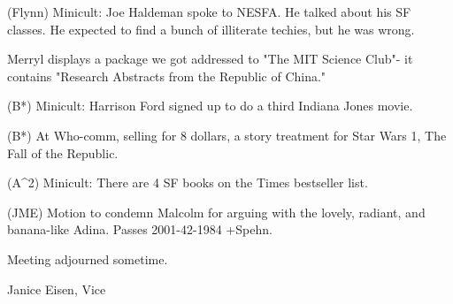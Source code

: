 \documentclass[12pt]{article}
\begin{document}
(Flynn) Minicult: Joe Haldeman spoke to NESFA. He talked about his SF classes. He expected to find a bunch of illiterate techies, but he was wrong.

Merryl displays a package we got addressed to "The MIT Science Club"- it contains "Research Abstracts from the Republic of China."

(B*) Minicult: Harrison Ford signed up to do a third Indiana Jones movie.

(B*) At Who-comm, selling for 8 dollars, a story treatment for Star Wars 1, The Fall of the Republic.

(A^2) Minicult: There are 4 SF books on the Times bestseller list.

(JME) Motion to condemn Malcolm for arguing with the lovely, radiant, and banana-like Adina. Passes 2001-42-1984 +Spehn.

\vspace{12pt}

\noindent
Meeting adjourned sometime.

\vspace{18pt}

\centerline{Janice Eisen, Vice}
\end{document}
